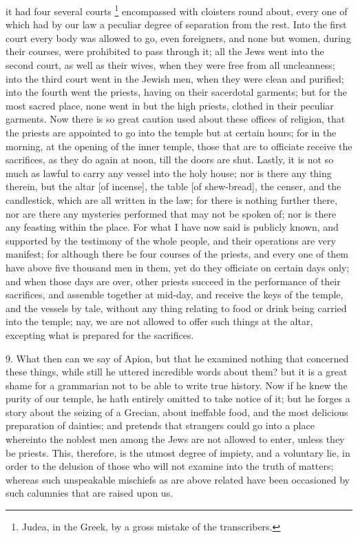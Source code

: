it had four several courts \footnote{Judea, in the Greek, by
a gross mistake of the transcribers.} encompassed with cloisters
round about, every one of which had by our law a peculiar degree of
separation from the rest. Into the first court every body was allowed to
go, even foreigners, and none but women, during their courses, were
prohibited to pass through it; all the Jews went into the second court, as
well as their wives, when they were free from all uncleanness; into the
third court went in the Jewish men, when they were clean and purified;
into the fourth went the priests, having on their sacerdotal garments; but
for the most sacred place, none went in but the high priests, clothed in
their peculiar garments. Now there is so great caution used about these
offices of religion, that the priests are appointed to go into the temple
but at certain hours; for in the morning, at the opening of the inner
temple, those that are to officiate receive the sacrifices, as they do
again at noon, till the doors are shut. Lastly, it is not so much as
lawful to carry any vessel into the holy house; nor is there any thing
therein, but the altar [of incense], the table [of shew-bread], the
censer, and the candlestick, which are all written in the law; for there
is nothing further there, nor are there any mysteries performed that may
not be spoken of; nor is there any feasting within the place. For what I
have now said is publicly known, and supported by the testimony of the
whole people, and their operations are very manifest; for although there
be four courses of the priests, and every one of them have above five
thousand men in them, yet do they officiate on certain days only; and when
those days are over, other priests succeed in the performance of their
sacrifices, and assemble together at mid-day, and receive the keys of the
temple, and the vessels by tale, without any thing relating to food or
drink being carried into the temple; nay, we are not allowed to offer such
things at the altar, excepting what is prepared for the sacrifices.

9. What then can we say of Apion, but that he examined nothing that
concerned these things, while still he uttered incredible words about
them? but it is a great shame for a grammarian not to be able to write
true history. Now if he knew the purity of our temple, he hath entirely
omitted to take notice of it; but he forges a story about the seizing of a
Grecian, about ineffable food, and the most delicious preparation of
dainties; and pretends that strangers could go into a place whereinto the
noblest men among the Jews are not allowed to enter, unless they be
priests. This, therefore, is the utmost degree of impiety, and a voluntary
lie, in order to the delusion of those who will not examine into the truth
of matters; whereas such unspeakable mischiefs as are above related have
been occasioned by such calumnies that are raised upon us.

